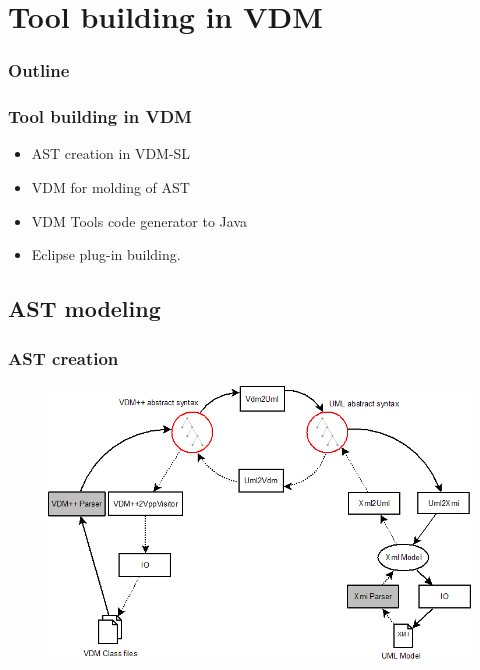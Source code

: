 %
%
\section{Tool building in VDM}
%
%
\begin{frame}
  \frametitle{Outline}
  \tableofcontents[current]
\end{frame}



%
%
\frame
{
  \frametitle{Tool building in VDM}
\begin{center}
  \begin{itemize}
  		\item AST creation in VDM-SL
  		\item VDM for molding of AST
  		\item VDM Tools code generator to Java
  		\item Eclipse plug-in building.
	  	
  \end{itemize}

\end{center}
}







\subsection{AST modeling}

%
%
\frame
{
  \frametitle{AST creation}

\begin{center}
\begin{figure}
\includegraphics[width=\textwidth]{images/OverviewOverMappingAST.png}
\end{figure}
\end{center}
}


